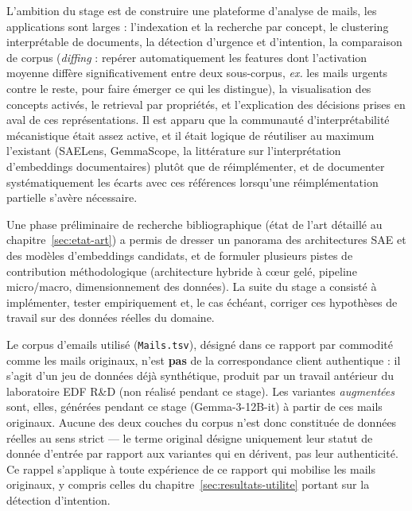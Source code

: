 \documentclass[11pt]{article}
\begin{document}
L'ambition du stage est de construire une plateforme d'analyse de
mails, les applications sont larges : l'indexation et la recherche par concept, le clustering
interprétable de documents, la détection d'urgence et d'intention, la
comparaison de corpus (\emph{diffing} : repérer automatiquement les features
dont l'activation moyenne diffère significativement entre deux sous-corpus,
\emph{ex.} les mails \og{}urgents\fg{} contre le reste, pour faire émerger ce
qui les distingue), la visualisation des concepts activés, le retrieval par
propriétés, et l'explication des décisions prises en aval de ces
représentations. Il est apparu que la communauté d'interprétabilité mécanistique était assez active, et il était logique de réutiliser au maximum
l'existant (SAELens, GemmaScope, la littérature sur l'interprétation
d'embeddings documentaires) plutôt que de réimplémenter, et de documenter
systématiquement les écarts avec ces références lorsqu'une réimplémentation
partielle s'avère nécessaire.

Une phase préliminaire de recherche bibliographique (état de l'art détaillé au
chapitre~\ref{sec:etat-art}) a permis de dresser un panorama des architectures
SAE et des modèles d'embeddings candidats, et de formuler plusieurs pistes de
contribution méthodologique (architecture hybride à cœur gelé, pipeline
micro/macro, dimensionnement des données). La suite du stage a consisté à
implémenter, tester empiriquement et, le cas échéant, corriger ces
hypothèses de travail sur des données réelles du domaine.

\begin{definitionbox}
Le corpus d'emails utilisé (\texttt{Mails.tsv}), désigné dans ce rapport par
commodité comme les mails \og{}originaux\fg{}, n'est \textbf{pas} de la
correspondance client authentique : il s'agit d'un jeu de données déjà
synthétique, produit par un travail antérieur du laboratoire EDF R\&D (non
réalisé pendant ce stage). Les variantes \emph{augmentées} sont, elles,
générées pendant ce stage (Gemma-3-12B-it) à partir de ces mails
\og{}originaux\fg{}. Aucune des deux couches du corpus n'est donc constituée
de données réelles au sens strict --- le terme \og{}original\fg{} désigne
uniquement leur statut de donnée d'entrée par rapport aux variantes qui en
dérivent, pas leur authenticité. Ce rappel s'applique à toute expérience de
ce rapport qui mobilise les mails \og{}originaux\fg{}, y compris celles du
chapitre~\ref{sec:resultats-utilite} portant sur la détection d'intention.
\end{definitionbox}
\end{document}
